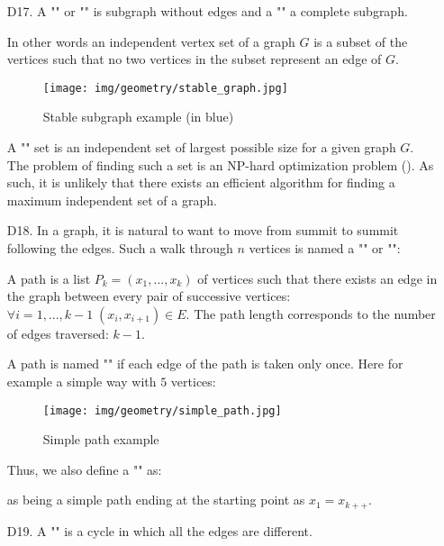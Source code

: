 {\begin{enumerate}
	\item[D17.] A "" or "" is subgraph without edges and a "" a complete subgraph.
	
	In other words an independent vertex set of a graph $G$ is a subset of the vertices such that no two vertices in the subset represent an edge of $G$. 
	\begin{figure}[H]
		\centering
		\texttt{[image: img/geometry/stable\_graph.jpg]}
		\caption{Stable subgraph example (in blue)}
	\end{figure}
	\begin{tcolorbox}[title=Remark,colframe=black,arc=10pt]
	A "" set is an independent set of largest possible size for a given graph $G$. The problem of finding such a set is an NP-hard optimization problem (). As such, it is unlikely that there exists an efficient algorithm for finding a maximum independent set of a graph.
	\end{tcolorbox}

	\item[D18.] In a graph, it is natural to want to move from summit to summit following the edges. Such a walk through $n$ vertices is named a ""  or "":
	
	A path is a list $P_k=(x_1,...,x_k)$ of vertices such that there exists an edge in the graph between every pair of successive vertices: $\forall i=1,...,k-1\; (x_i,x_{i+1})\in E$. The path length corresponds to the number of edges traversed: $k-1$.
	
	A path is named "" if each edge of the path is taken only once. Here for example a simple way with $5$ vertices:
	\begin{figure}[H]
		\centering
		\texttt{[image: img/geometry/simple\_path.jpg]}
		\caption{Simple path example}
	\end{figure}
	Thus, we also define a "" as:
	
	as being a simple path ending at the starting point as $x_1=x_{k++}$. 
	
	\item[D19.] A "" is a cycle in which all the edges are different.
	

\end{enumerate}}
